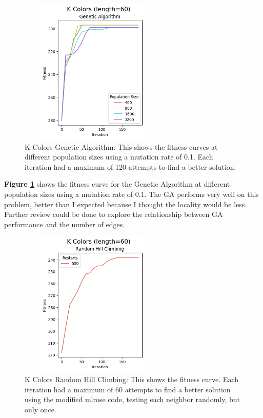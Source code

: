 \documentclass[letterpaper]{article} %
\begin{document}
\begin{figure}[!htb]
\centering
\includegraphics[width=2.75in, height=2.75in]{figures/K_Colors_length=60_Genetic_Algorithm_l_60_ma_120_p_400__800__1600__3200_mu_0.1_.png}
\caption{K Colors Genetic Algorithm: This shows the fitness curves at different population sizes using a mutation rate of 0.1. Each iteration had a maximum of 120 attempts to find a better solution. }
\label{fig:kcolor_ga}
\end{figure}

\textbf{Figure \ref{fig:kcolor_ga}} shows the fitness curve for the Genetic Algorithm at different population sizes using a mutation rate of 0.1.   The GA performs very well on this problem, better than I expected because I thought the locality would be less.  Further review could be done to explore the relationship between GA performance and the number of edges.  

\begin{figure}[!htb]
\centering
\includegraphics[width=2.75in, height=2.75in]{figures/K_Colors_length=60_Random_Hill_Climbing_l_60_ma_60_r_500_.png}
\caption{K Colors Random Hill Climbing: This shows the fitness curve. Each iteration had a maximum of 60 attempts to find a better solution using the modified mlrose code, testing each neighbor randomly, but only once. }
\label{fig:kcolor_rhc}
\end{figure}
\end{document}
